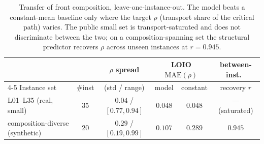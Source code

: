 \documentclass[11pt]{article}
\begin{document}
\begin{table}[t]
\centering\small
\caption{Transfer of front composition, leave-one-instance-out. The model beats a
constant-mean baseline only where the target $\rho$ (transport share of the critical path)
varies. The public small set is transport-saturated and does not discriminate between the
two; on a composition-spanning set the structural predictor recovers $\rho$ across unseen
instances at $r=0.945$.}
\label{tab:amortise}
\setlength{\tabcolsep}{5pt}
\begin{tabular}{lccccc}
\toprule
& & $\rho$ spread & \multicolumn{2}{c}{LOIO $\mathrm{MAE}(\rho)$} & between-inst.\ \\
\cmidrule(lr){4-5}
Instance set & \#inst & (std / range) & model & constant & recovery $r$ \\
\midrule
\textsf{L01--L35} (real, small) & 35 & $0.04$ / $[0.77,0.94]$ & $0.048$ & $0.048$ & --- (saturated) \\
composition-diverse (synthetic) & 20 & $0.29$ / $[0.19,0.99]$ & $\mathbf{0.107}$ & $0.289$ & $\mathbf{0.945}$ \\
\bottomrule
\end{tabular}
\end{table}
\end{document}
